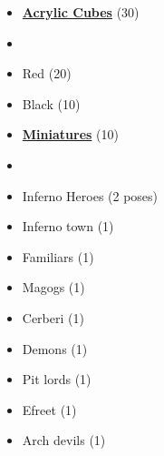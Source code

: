\begin{multicols*}{3}
\begin{itemize}[leftmargin=0pt, label={}, noitemsep]
  \item \textbf{\small{\underline{Acrylic Cubes}}} (30)
  \item
  \item Red (20)
  \item Black (10)
\end{itemize}

\begin{itemize}[leftmargin=0pt, label={}, noitemsep]
  \item \textbf{\small{\underline{Miniatures}}} (10)
  \item
  \item Inferno Heroes (2 poses)
  \item Inferno town (1)
  \item Familiars (1)
  \item Magogs (1)
  \item Cerberi (1)
  \item Demons (1)
  \item Pit lords (1)
  \item Efreet (1)
  \item Arch devils (1)
\end{itemize}


\end{multicols*}

